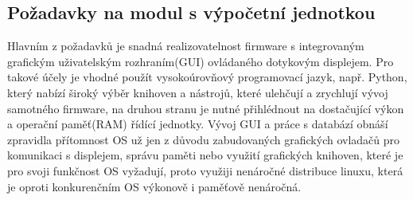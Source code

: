 
\subsection{Požadavky na modul s výpočetní jednotkou} %

%

Hlavním z požadavků je snadná realizovatelnost firmware s integrovaným grafickým uživatelským rozhraním(GUI) ovládaného dotykovým displejem. Pro takové účely je vhodné použít vysokoúrovňový programovací jazyk, např. Python, který nabízí široký výběr knihoven a nástrojů, které ulehčují a zrychlují vývoj samotného firmware, na druhou stranu je nutné přihlédnout na dostačující výkon a operační paměť(RAM) řídící jednotky. Vývoj GUI a práce s databází obnáší zpravidla přítomnost OS už jen z důvodu zabudovaných grafických ovladačů pro komunikaci s displejem, správu paměti nebo využití grafických knihoven, které je pro svoji funkčnost OS vyžadují, proto využiji nenáročné distribuce linuxu, která je oproti konkurenčním OS výkonově i paměťově nenáročná.


